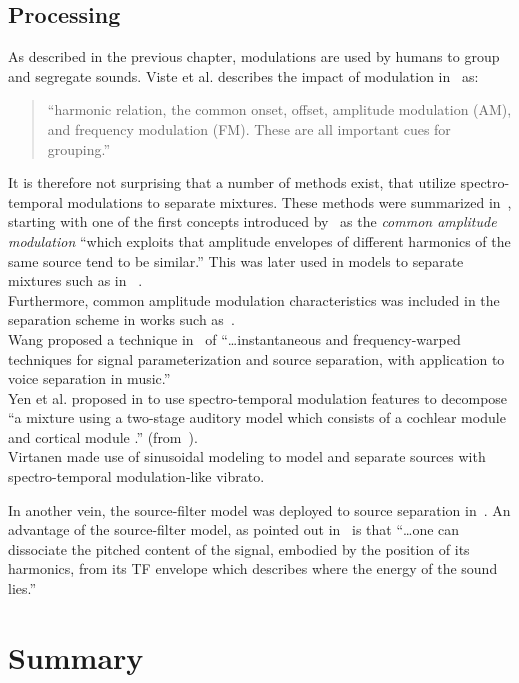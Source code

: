 \subsection{Processing}

As described in the previous chapter, modulations are used by humans to group and segregate sounds. Viste et al. describes the impact of modulation in~\cite{viste03} as:

\begin{quote}
``harmonic relation, the common onset, offset, amplitude modulation (AM), and frequency modulation (FM). These are all important cues for grouping.''
\end{quote}

It is therefore not surprising that a number of methods exist, that utilize spectro-temporal modulations to separate mixtures. 
These methods were summarized in~\cite{rafii}, starting with one of the first concepts introduced by~\cite{bregman90} as the \emph{common amplitude modulation} ``which exploits that amplitude envelopes of different harmonics of the same source tend to be similar.''
This was later used in models to separate mixtures such as in ~\cite{li07, li09}.\\
Furthermore, common amplitude modulation characteristics was included in the separation scheme in works such as~\cite{cano14}.\\
Wang proposed a technique in~\cite{wang94,wang95} of ``\dots instantaneous and frequency-warped techniques for signal parameterization and source separation, with application to voice separation in music.''\\
Yen et al. proposed in \cite{yen14,yen15} to use spectro-temporal modulation features to decompose ``a mixture using a two-stage auditory model which consists of a cochlear module \cite{chi05} and cortical module \cite{chi99}.'' (from~\cite{rafii}).\\
Virtanen made use of sinusoidal modeling \cite{virtanen00} to model and separate sources with spectro-temporal modulation-like vibrato.

In another vein, the source-filter model was deployed to source separation in~\cite{hennequin10}.
An advantage of the source-filter model, as pointed out in~\cite{rafii} is that ``\dots one can dissociate the pitched content of the signal, embodied by the position of its harmonics, from its TF envelope which describes where the energy of the sound lies.''

\section{Summary}

